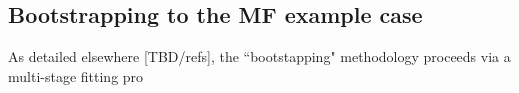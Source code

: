 \subsection{Bootstrapping to the MF example case}

As detailed elsewhere [TBD/refs], the ``bootstapping" methodology proceeds via a multi-stage fitting pro